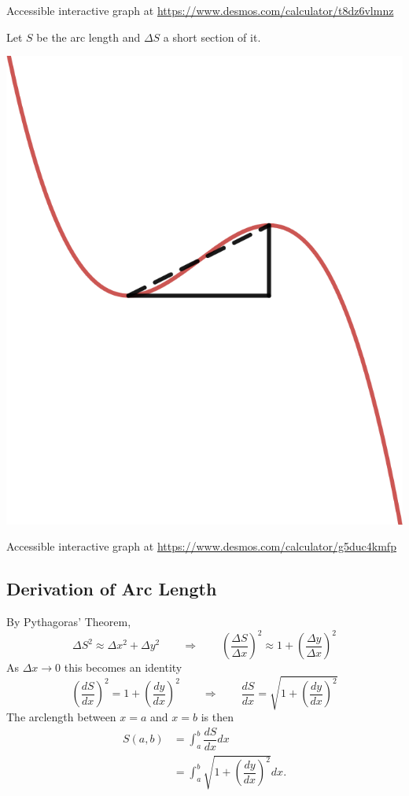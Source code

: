 \documentclass[
  12pt,
  a4paper]{article}
\begin{document}
\flushleft

Accessible interactive graph at
\url{https://www.desmos.com/calculator/t8dz6vlmnz}

Let \(S\) be the arc length and \(\Delta S\) a short section of it.

\centering

\includegraphics[height=0.2\textheight]{arclengthdx}

\flushleft

Accessible interactive graph at
\url{https://www.desmos.com/calculator/g5duc4kmfp}

\hypertarget{derivation-of-arc-length}{%
\subsection{Derivation of Arc Length}\label{derivation-of-arc-length}}

By Pythagoras' Theorem, \[
\Delta S^2 \approx \Delta x^2+\Delta y^2
\qquad \Rightarrow\qquad
\left(\dfrac{\Delta S}{\Delta x}\right)^2 \approx 1+\left(\dfrac{\Delta y}{\Delta x}\right)^2
\] As \(\Delta x\to0\) this becomes an identity \[
\left(\dfrac{dS}{dx}\right)^2 = 1+\left(\dfrac{dy}{dx}\right)^2
\qquad\Rightarrow\qquad
\dfrac{dS}{dx} = \sqrt{1+\left(\dfrac{dy}{dx}\right)^2}
\] The arclength between \(x=a\) and \(x=b\) is then \[
\begin{aligned}
  S(a,b) &= \int_a^b\dfrac{dS}{dx}dx\\
  &= \int_a^b\sqrt{1+\left(\dfrac{dy}{dx}\right)^2}dx.
\end{aligned}
\]
\end{document}

